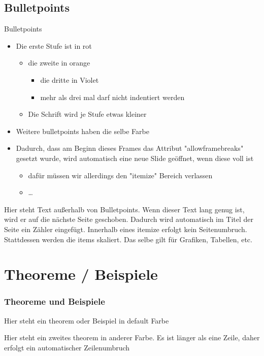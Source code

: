 \documentclass{beamer}
\begin{document}
\subsection{Bulletpoints}\label{sec:itemize}
\begin{frame}[allowframebreaks]{Bulletpoints}
    \begin{itemize}
        \item Die erste Stufe ist in rot
        \begin{itemize}
            \item die zweite in orange
            \begin{itemize}
                \item die dritte in Violet
                \item mehr als drei mal darf nicht indentiert werden
            \end{itemize}    
            \item Die Schrift wird je Stufe etwas kleiner
        \end{itemize}    
        \item Weitere bulletpoints haben die selbe Farbe
        \item Dadurch, dass am Beginn dieses Frames das Attribut "allowframebreaks" gesetzt wurde, wird automatisch eine neue Slide geöffnet, wenn diese voll ist
        \begin{itemize}
            \item dafür müssen wir allerdings den "itemize" Bereich verlassen
            \item \dots
        \end{itemize}
    \end{itemize}
    Hier steht Text außerhalb von Bulletpoints. Wenn dieser Text lang genug ist, wird er auf die nächste Seite geschoben.
    Dadurch wird automatisch im Titel der Seite ein Zähler eingefügt. 
    Innerhalb eines itemize erfolgt kein Seitenumbruch. Stattdessen werden die items skaliert. Das selbe gilt für Grafiken, Tabellen, etc.
\end{frame}

\section{Theoreme / Beispiele}\label{sec:theorem}
\begin{frame} 
    \frametitle{Theoreme und Beispiele} 
    \begin{theorem}
        Hier steht ein theorem oder Beispiel in default Farbe
    \end{theorem}

    \begin{theorem}
        Hier steht ein zweites theorem in anderer Farbe. Es ist länger als eine Zeile, daher erfolgt ein automatischer Zeilenumbruch
    \end{theorem}
\end{frame}
\end{document}
